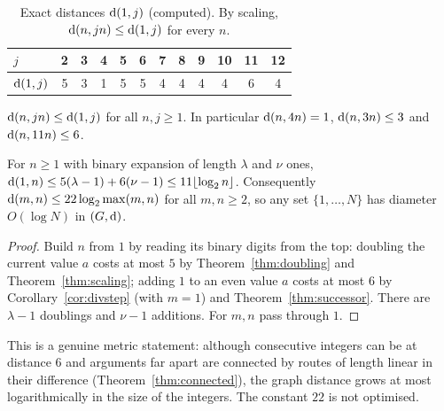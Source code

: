 \begin{table}[ht]\centering\small
\begin{tabular}{@{}l*{11}{c}@{}}\toprule
$j$ & 2&3&4&5&6&7&8&9&10&11&12\\\midrule
$\operatorname{d}(1,j)$ & 5&3&1&5&5&4&4&4&4&6&4\\\bottomrule\end{tabular}
\caption{Exact distances $\operatorname{d}(1,j)$ (computed). By scaling, $\operatorname{d}(n,jn)\le\operatorname{d}(1,j)$ for every $n$.}\label{tab:multiples}\end{table}
\begin{corollary}[Multiples]\label{cor:multiples}
$\operatorname{d}(n,jn)\le\operatorname{d}(1,j)$ for all $n,j\ge1$. In particular $\operatorname{d}(n,4n)=1$, $\operatorname{d}(n,3n)\le3$ and $\operatorname{d}(n,11n)\le6$.
\end{corollary}

\begin{corollary}\label{cor:log}
For $n\ge1$ with binary expansion of length $\lambda$ and $\nu$ ones, $\operatorname{d}(1,n)\le5(\lambda-1)+6(\nu-1)\le11\lfloor\log_2n\rfloor$. Consequently $\operatorname{d}(m,n)\le22\log_2\max(m,n)$ for all $m,n\ge2$, so any set $\{1,\dots,N\}$ has diameter $O(\log N)$ in $(G,\operatorname{d})$.
\end{corollary}
\begin{proof} Build $n$ from $1$ by reading its binary digits from the top: doubling the current value $a$ costs at most $5$ by Theorem~\ref{thm:doubling} and Theorem~\ref{thm:scaling}; adding $1$ to an even value $a$ costs at most $6$ by Corollary~\ref{cor:divstep} (with $m=1$) and Theorem~\ref{thm:successor}. There are $\lambda-1$ doublings and $\nu-1$ additions. For $m,n$ pass through $1$. \end{proof}
This is a genuine metric statement: although consecutive integers can be at distance $6$ and arguments far apart are connected by routes of length linear in their difference (Theorem~\ref{thm:connected}), the graph distance grows at most logarithmically in the size of the integers. The constant $22$ is not optimised.
